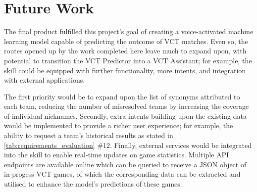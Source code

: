 \section{Future Work}
\label{sec:futureWork}
The final product fulfilled this project's goal of creating a voice-activated machine learning model capable of predicting the outcome of VCT matches. Even so, the routes opened up by the work completed here leave much to expand upon, with potential to transition the VCT Predictor into a VCT Assistant; for example, the skill could be equipped with further functionality, more intents, and integration with external applications.

The first priority would be to expand upon the list of synonyms attributed to each team, reducing the number of misresolved teams by increasing the coverage of individual nicknames. Secondly, extra intents building upon the existing data would be implemented to provide a richer user experience; for example, the ability to request a team's historical results as stated in \autoref{tab:requirements_evaluation} \#12. Finally, external services would be integrated into the skill to enable real-time updates on game statistics. Multiple API endpoints are available online which can be queried to receive a JSON object of in-progess VCT games, of which the corresponding data can be extracted and utilised to enhance the model's predictions of these games.